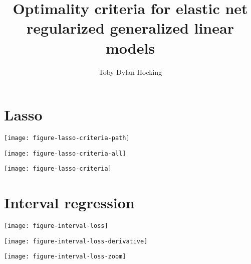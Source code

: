 \documentclass{article}
\begin{document}
\title{Optimality criteria for elastic net regularized generalized linear models}
\author{Toby Dylan Hocking}
\maketitle

\section{Lasso}

\texttt{[image: figure-lasso-criteria-path]}

\texttt{[image: figure-lasso-criteria-all]}

\texttt{[image: figure-lasso-criteria]}

\section{Interval regression}

\texttt{[image: figure-interval-loss]}

\texttt{[image: figure-interval-loss-derivative]}

\texttt{[image: figure-interval-loss-zoom]}
\end{document}
